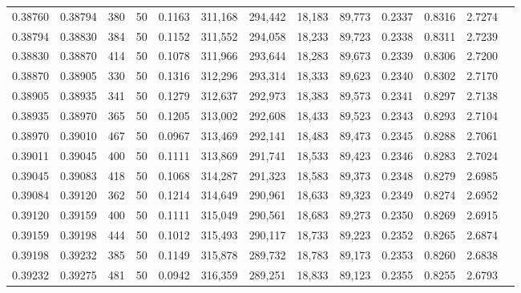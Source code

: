 \begin{tabular}{rrrrrrrrrrrrr}
0.38760 & 0.38794 &   380 &  50 &                                     0.1163 & 311,168 & 294,442 &  18,183 &  89,773 & 0.2337 & 0.8316 & 2.7274 \\
0.38794 & 0.38830 &   384 &  50 &                                     0.1152 & 311,552 & 294,058 &  18,233 &  89,723 & 0.2338 & 0.8311 & 2.7239 \\
0.38830 & 0.38870 &   414 &  50 &                                     0.1078 & 311,966 & 293,644 &  18,283 &  89,673 & 0.2339 & 0.8306 & 2.7200 \\
0.38870 & 0.38905 &   330 &  50 &                                     0.1316 & 312,296 & 293,314 &  18,333 &  89,623 & 0.2340 & 0.8302 & 2.7170 \\
0.38905 & 0.38935 &   341 &  50 &                                     0.1279 & 312,637 & 292,973 &  18,383 &  89,573 & 0.2341 & 0.8297 & 2.7138 \\
0.38935 & 0.38970 &   365 &  50 &                                     0.1205 & 313,002 & 292,608 &  18,433 &  89,523 & 0.2343 & 0.8293 & 2.7104 \\
0.38970 & 0.39010 &   467 &  50 &                                     0.0967 & 313,469 & 292,141 &  18,483 &  89,473 & 0.2345 & 0.8288 & 2.7061 \\
0.39011 & 0.39045 &   400 &  50 &                                     0.1111 & 313,869 & 291,741 &  18,533 &  89,423 & 0.2346 & 0.8283 & 2.7024 \\
0.39045 & 0.39083 &   418 &  50 &                                     0.1068 & 314,287 & 291,323 &  18,583 &  89,373 & 0.2348 & 0.8279 & 2.6985 \\
0.39084 & 0.39120 &   362 &  50 &                                     0.1214 & 314,649 & 290,961 &  18,633 &  89,323 & 0.2349 & 0.8274 & 2.6952 \\
0.39120 & 0.39159 &   400 &  50 &                                     0.1111 & 315,049 & 290,561 &  18,683 &  89,273 & 0.2350 & 0.8269 & 2.6915 \\
0.39159 & 0.39198 &   444 &  50 &                                     0.1012 & 315,493 & 290,117 &  18,733 &  89,223 & 0.2352 & 0.8265 & 2.6874 \\
0.39198 & 0.39232 &   385 &  50 &                                     0.1149 & 315,878 & 289,732 &  18,783 &  89,173 & 0.2353 & 0.8260 & 2.6838 \\
0.39232 & 0.39275 &   481 &  50 &                                     0.0942 & 316,359 & 289,251 &  18,833 &  89,123 & 0.2355 & 0.8255 & 2.6793 \\

\end{tabular}
